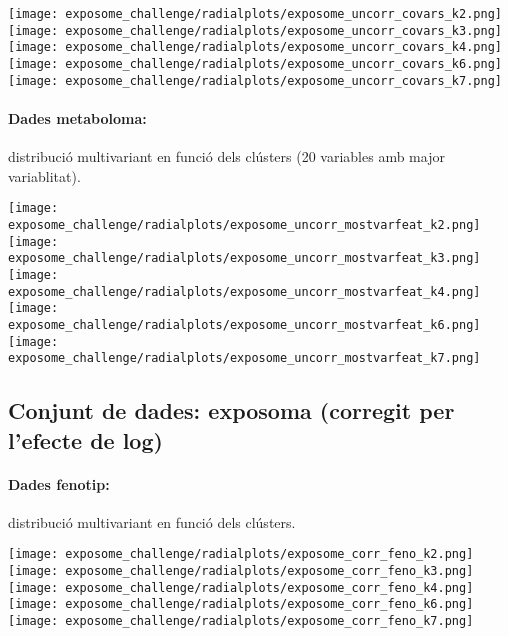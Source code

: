 \documentclass[CAT,BIB]{TFUOC}%
\begin{document}
            \begin{center}
                \texttt{[image: exposome\_challenge/radialplots/exposome\_uncorr\_covars\_k2.png]}
                \texttt{[image: exposome\_challenge/radialplots/exposome\_uncorr\_covars\_k3.png]}
                \texttt{[image: exposome\_challenge/radialplots/exposome\_uncorr\_covars\_k4.png]}
                \texttt{[image: exposome\_challenge/radialplots/exposome\_uncorr\_covars\_k6.png]}
                \texttt{[image: exposome\_challenge/radialplots/exposome\_uncorr\_covars\_k7.png]}
            \end{center}

            \paragraph{Dades metaboloma:} distribució multivariant en funció dels clústers (20 variables amb major variablitat).

            \begin{center}
                \texttt{[image: exposome\_challenge/radialplots/exposome\_uncorr\_mostvarfeat\_k2.png]}
                \texttt{[image: exposome\_challenge/radialplots/exposome\_uncorr\_mostvarfeat\_k3.png]}
                \texttt{[image: exposome\_challenge/radialplots/exposome\_uncorr\_mostvarfeat\_k4.png]}
                \texttt{[image: exposome\_challenge/radialplots/exposome\_uncorr\_mostvarfeat\_k6.png]}
                \texttt{[image: exposome\_challenge/radialplots/exposome\_uncorr\_mostvarfeat\_k7.png]}
            \end{center}

        \subsection{Conjunt de dades: exposoma (corregit per l'efecte de log)}

            \paragraph{Dades fenotip:} distribució multivariant en funció dels clústers.

            \begin{center}
                \texttt{[image: exposome\_challenge/radialplots/exposome\_corr\_feno\_k2.png]}
                \texttt{[image: exposome\_challenge/radialplots/exposome\_corr\_feno\_k3.png]}
                \texttt{[image: exposome\_challenge/radialplots/exposome\_corr\_feno\_k4.png]}
                \texttt{[image: exposome\_challenge/radialplots/exposome\_corr\_feno\_k6.png]}
                \texttt{[image: exposome\_challenge/radialplots/exposome\_corr\_feno\_k7.png]}
            \end{center}
\end{document}
